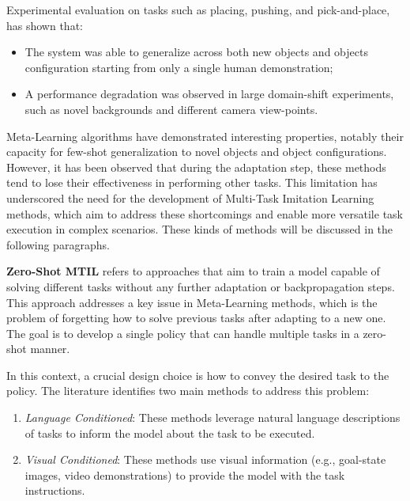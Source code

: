 
\newline Experimental evaluation on tasks such as placing, pushing, and pick-and-place, has shown that: \begin{itemize}
    \item The system was able to generalize across both new objects and objects configuration starting from only a single human demonstration;
    \item A performance degradation was observed in large domain-shift experiments, such as novel backgrounds and different camera view-points.
\end{itemize}


Meta-Learning algorithms have demonstrated interesting properties, notably their capacity for few-shot generalization to novel objects and object configurations. However, it has been observed that during the adaptation step, these methods tend to lose their effectiveness in performing other tasks. This limitation has underscored the need for the development of Multi-Task Imitation Learning methods, which aim to address these shortcomings and enable more versatile task execution in complex scenarios. These kinds of methods will be discussed in the following paragraphs.

\textbf{Zero-Shot MTIL} refers to approaches that aim to train a model capable of solving different tasks without any further adaptation or backpropagation steps. This approach addresses a key issue in Meta-Learning methods, which is the problem of forgetting how to solve previous tasks after adapting to a new one. The goal is to develop a single policy that can handle multiple tasks in a zero-shot manner.

In this context, a crucial design choice is how to convey the desired task to the policy. The literature identifies two main methods to address this problem:

\begin{enumerate}
    \item \textit{Language Conditioned}: These methods leverage natural language descriptions of tasks to inform the model about the task to be executed.
    \item \textit{Visual Conditioned}: These methods use visual information (e.g., goal-state images, video demonstrations) to provide the model with the task instructions.
\end{enumerate}

